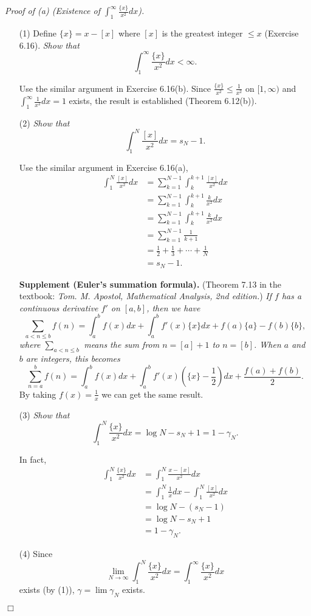 \documentclass{article}
\begin{document}
\emph{Proof of (a) (Existence of $\int_{1}^{\infty} \frac{\{x\}}{x^2} dx$).}
\begin{enumerate}
\item[(1)]
Define $\{x\} = x - [x]$ where $[x]$ is the greatest integer $\leq x$
(Exercise 6.16).
\emph{Show that
\[
  \int_{1}^{\infty} \frac{\{x\}}{x^2} dx < \infty.
\]}

Use the similar argument in Exercise 6.16(b).
Since
$\frac{\{x\}}{x^2} \leq \frac{1}{x^2}$ on $[1,\infty)$
and $\int_{1}^{\infty} \frac{1}{x^2} dx = 1$ exists,
the result is established (Theorem 6.12(b)).

\item[(2)]
\emph{Show that
\[
  \int_{1}^{N} \frac{[x]}{x^2} dx = s_N - 1.
\]}

Use the similar argument in Exercise 6.16(a),
\begin{align*}
  \int_{1}^{N} \frac{[x]}{x^2} dx
  &= \sum_{k=1}^{N-1} \int_{k}^{k+1} \frac{[x]}{x^2} dx \\
  &= \sum_{k=1}^{N-1} \int_{k}^{k+1} \frac{k}{x^2} dx \\
  &= \sum_{k=1}^{N-1} \int_{k}^{k+1} \frac{k}{x^2} dx \\
  &= \sum_{k=1}^{N-1} \frac{1}{k+1} \\
  &= \frac{1}{2} + \frac{1}{3} + \cdots + \frac{1}{N} \\
  &= s_N - 1.
\end{align*}

\textbf{Supplement (Euler's summation formula).}
(Theorem 7.13 in the textbook:
\emph{Tom. M. Apostol, Mathematical Analysis, 2nd edition.})
\emph{If $f$ has a continuous derivative $f'$ on $[a,b]$, then we have
\[
  \sum_{a < n \leq b} f(n)
  = \int_{a}^{b} f(x)dx
  + \int_{a}^{b} f'(x)\{x\}dx + f(a)\{a\} - f(b)\{b\},
\]
where $\sum_{a < n \leq b}$ means the sum from $n=[a]+1$ to $n=[b]$.
When $a$ and $b$ are integers, this becomes
\[
  \sum_{n=a}^{b} f(n)
  = \int_{a}^{b} f(x)dx
  + \int_{a}^{b} f'(x)\left( \{x\}-\frac{1}{2} \right)dx
  + \frac{f(a)+f(b)}{2}.
\]}
By taking $f(x) = \frac{1}{x}$ we can get the same result. \\

\item[(3)]
\emph{Show that
\[
  \int_{1}^{N} \frac{\{x\}}{x^2} dx = \log N - s_N + 1 = 1 - \gamma_N.
\]}

In fact,
\begin{align*}
  \int_{1}^{N} \frac{\{x\}}{x^2} dx
  &= \int_{1}^{N} \frac{x-[x]}{x^2} dx \\
  &= \int_{1}^{N} \frac{1}{x} dx - \int_{1}^{N} \frac{[x]}{x^2} dx \\
  &= \log N - (s_N - 1) \\
  &= \log N - s_N + 1 \\
  &= 1 - \gamma_N.
\end{align*}

\item[(4)]
Since
\[
  \lim_{N \to \infty} \int_{1}^{N} \frac{\{x\}}{x^2} dx
  = \int_{1}^{\infty} \frac{\{x\}}{x^2} dx
\]
exists (by (1)),
$\gamma = \lim \gamma_N$ exists.
\end{enumerate}
$\Box$ \\
\end{document}
